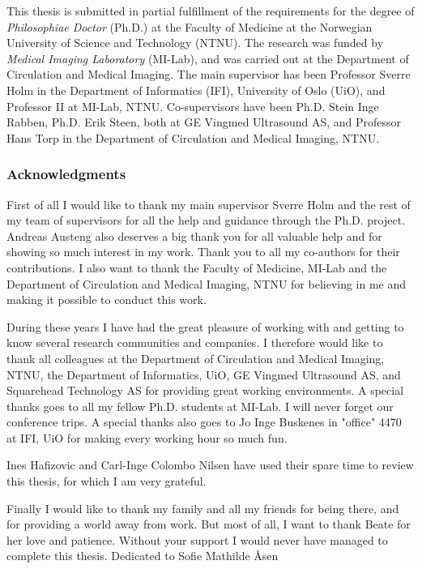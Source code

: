 \documentclass[10pt,b5paper,twoside]{book}
\begin{document}


%
This thesis is submitted in partial fulfillment of the requirements for the degree of \textit{Philosophiae Doctor} (Ph.D.) at the Faculty of Medicine at the Norwegian University of Science and Technology (NTNU). The research was funded by \textit{Medical Imaging Laboratory} (MI-Lab), and was carried out at the Department of Circulation and Medical Imaging. The main supervisor has been Professor Sverre Holm in the Department of Informatics (IFI), University of Oslo (UiO), and Professor II at MI-Lab, NTNU. Co-supervisors have been Ph.D. Stein Inge Rabben, Ph.D. Erik Steen, both at GE Vingmed Ultrasound AS, and Professor Hans Torp in the Department of Circulation and Medical Imaging, NTNU.


\subsubsection{Acknowledgments}
First of all I would like to thank my main supervisor Sverre Holm and the rest of my team of supervisors for all the help and guidance through the Ph.D. project. Andreas Austeng also deserves a big thank you for all valuable help and for showing so much interest in my work. Thank you to all my co-authors for their contributions. I also want to thank the Faculty of Medicine, MI-Lab and the Department of Circulation and Medical Imaging, NTNU for believing in me and making it possible to conduct this work.

During these years I have had the great pleasure of working with and getting to know several research communities and companies. I therefore would like to thank all colleagues at the Department of Circulation and Medical Imaging, NTNU, the Department of Informatics, UiO, GE Vingmed Ultrasound AS, and Squarehead Technology AS for providing great working environments. A special thanks goes to all my fellow Ph.D. students at MI-Lab. I will never forget our conference trips. A special thanks also goes to Jo Inge Buskenes in "office" 4470 at IFI, UiO for making every working hour so much fun.

Ines Hafizovic and Carl-Inge Colombo Nilsen have used their spare time to review this thesis, for which I am very grateful.  

Finally I would like to thank my family and all my friends for being there, and for providing a world away from work. But most of all, I want to thank Beate for her love and patience. Without your support I would never have managed to complete this thesis.
\null
\vfill
\hfill Dedicated to Sofie Mathilde \AA{}sen
\end{document}

